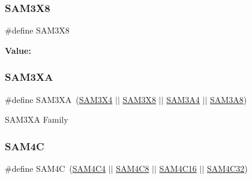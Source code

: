 \subsubsection{\texorpdfstring{SAM3X8}{SAM3X8}}
{\footnotesize\ttfamily \#define S\+A\+M3\+X8}

{\bfseries Value\+:}
\begin{DoxyCode}{0}
\DoxyCodeLine{( \(\backslash\)}
\DoxyCodeLine{        )}

\end{DoxyCode}
\mbox{\label{group__sam__part__macros__group_gaae4990dfaa4eeed17d8a0351cca02fdd}} 
\subsubsection{\texorpdfstring{SAM3XA}{SAM3XA}}
{\footnotesize\ttfamily \#define S\+A\+M3\+XA~(\mbox{\hyperlink{group__sam__part__macros__group_ga735357bdbbd05356a7829e517fb4203f}{S\+A\+M3\+X4}} $\vert$$\vert$ \mbox{\hyperlink{group__sam__part__macros__group_ga13be8353e38999aaca5c412c895c15da}{S\+A\+M3\+X8}} $\vert$$\vert$ \mbox{\hyperlink{group__sam__part__macros__group_ga1f4481b0cd1b2c1a4636999b6a433b9f}{S\+A\+M3\+A4}} $\vert$$\vert$ \mbox{\hyperlink{group__sam__part__macros__group_gab1397a5e346af96e5ed34027ed3b4de8}{S\+A\+M3\+A8}})}

S\+A\+M3\+XA Family \mbox{\label{group__sam__part__macros__group_gae1b7bd715bae14e9d8eef1a0f01b15ce}} 
\subsubsection{\texorpdfstring{SAM4C}{SAM4C}}
{\footnotesize\ttfamily \#define S\+A\+M4C~(\mbox{\hyperlink{group__sam__part__macros__group_ga63e801e944f8a131c2f940addf134ac7}{S\+A\+M4\+C4}} $\vert$$\vert$ \mbox{\hyperlink{group__sam__part__macros__group_ga8a05a38838ed43d62f89266155741aeb}{S\+A\+M4\+C8}} $\vert$$\vert$ \mbox{\hyperlink{group__sam__part__macros__group_ga74d1bd22ed59bc6a2c34d9d723332931}{S\+A\+M4\+C16}} $\vert$$\vert$ \mbox{\hyperlink{group__sam__part__macros__group_ga4db5c63ded057f50bd4359538bc1299f}{S\+A\+M4\+C32}})}

